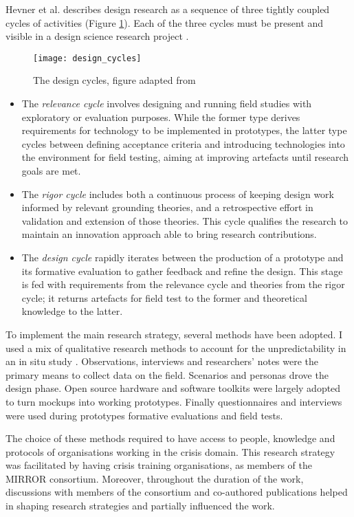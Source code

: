 Hevner et al. \autocite*{Havner2004} describes design research as a sequence of three tightly coupled cycles of activities (Figure \ref{fig:design-cycles}). Each of the three cycles must be present and visible in a design science research project \autocite{Hevner:2010gc}.
\begin{figure}
	[tbh] \centering 
	\texttt{[image: design\_cycles]} \caption{The design cycles, figure adapted from \protect\autocite{hevner2007three}} \label{fig:design-cycles} 
\end{figure}
\begin{itemize}
	\item The \emph{relevance cycle} involves designing and running field studies with exploratory or evaluation purposes. While the former type derives requirements for technology to be implemented in prototypes, the latter type cycles between defining acceptance criteria and introducing technologies into the environment for field testing, aiming at improving artefacts until research goals are met. 
	\item The \emph{rigor cycle} includes both a continuous process of keeping design work informed by relevant grounding theories, and a retrospective effort in validation and extension of those theories. This cycle qualifies the research to maintain an innovation approach able to bring research contributions. 
	\item The \emph{design cycle} rapidly iterates between the production of a prototype and its formative evaluation to gather feedback and refine the design. This stage is fed with requirements from the relevance cycle and theories from the rigor cycle; it returns artefacts for field test to the former and theoretical knowledge to the latter. 
\end{itemize}

To implement the main research strategy, several methods have been adopted. I used a mix of qualitative research methods to account for the unpredictability in an in situ study \autocite{Rogers:2007gv}. Observations, interviews and researchers' notes were the primary means to collect data on the field. Scenarios and personas drove the design phase. Open source hardware and software toolkits were largely adopted to turn mockups into working prototypes. Finally questionnaires and interviews were used during prototypes formative evaluations and field tests.

The choice of these methods required to have access to people, knowledge and protocols of organisations working in the crisis domain. This research strategy was facilitated by having crisis training organisations, as members of the MIRROR consortium. Moreover, throughout the duration of the work, discussions with members of the consortium and co-authored publications helped in shaping research strategies and partially influenced the work.

